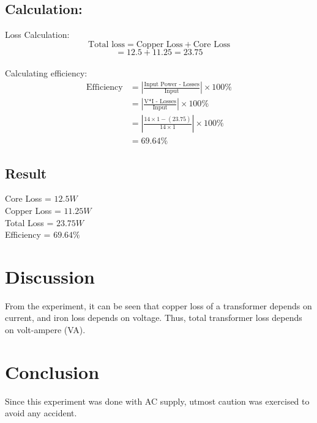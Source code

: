 \documentclass[12pt]{article}
\begin{document}
\subsection{Calculation:}
Loss Calculation:\\
\[\text{Total loss} = \text{Copper Loss} + \text{Core Loss}\]
\[= 12.5+11.25 = 23.75\]\\
Calculating efficiency:
\begin{align*}
    \text{Efficiency} & = |\frac{\text{Input Power - Losses}}{\text{Input}} |\times100\% \\
                      & = |\frac{\text{V*I - Losses}}{\text{Input}} |\times100\%         \\
                      & = |\frac{14\times1 - (23.75)}{14\times 1}|\times 100\%           \\
                      & = 69.64\%
\end{align*}

\subsection{Result}

Core Loss   = \(12.5 W\)   \\
Copper Loss  = \(11.25 W\) \\
Total Loss = \(23.75 W\)\\
Efficiency = \(69.64\%\)

\section{Discussion}
From the experiment, it can be seen that copper loss of a transformer depends on current, and iron loss depends on voltage. Thus, total transformer loss depends on volt-ampere (VA).\cite{openShort}

\section{Conclusion}
Since this experiment was done with AC supply, utmost caution was exercised to avoid any accident.


\end{document}
